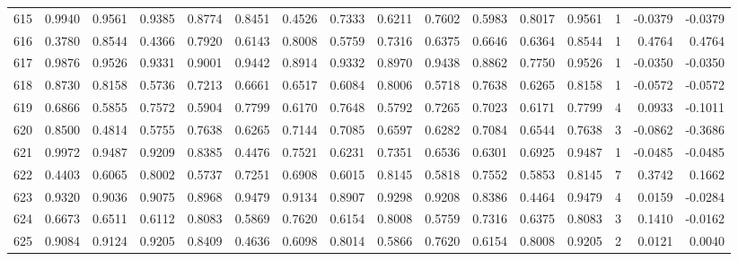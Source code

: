 \begin{tabular}{lrrrrrrrrrrrrrrr}
615 &      0.9940 &  0.9561 &  0.9385 &  0.8774 &  0.8451 &  0.4526 &  0.7333 &  0.6211 &  0.7602 &  0.5983 &   0.8017 &     0.9561 &      1 &                   -0.0379 &                    -0.0379 \\
616 &      0.3780 &  0.8544 &  0.4366 &  0.7920 &  0.6143 &  0.8008 &  0.5759 &  0.7316 &  0.6375 &  0.6646 &   0.6364 &     0.8544 &      1 &                    0.4764 &                     0.4764 \\
617 &      0.9876 &  0.9526 &  0.9331 &  0.9001 &  0.9442 &  0.8914 &  0.9332 &  0.8970 &  0.9438 &  0.8862 &   0.7750 &     0.9526 &      1 &                   -0.0350 &                    -0.0350 \\
618 &      0.8730 &  0.8158 &  0.5736 &  0.7213 &  0.6661 &  0.6517 &  0.6084 &  0.8006 &  0.5718 &  0.7638 &   0.6265 &     0.8158 &      1 &                   -0.0572 &                    -0.0572 \\
619 &      0.6866 &  0.5855 &  0.7572 &  0.5904 &  0.7799 &  0.6170 &  0.7648 &  0.5792 &  0.7265 &  0.7023 &   0.6171 &     0.7799 &      4 &                    0.0933 &                    -0.1011 \\
620 &      0.8500 &  0.4814 &  0.5755 &  0.7638 &  0.6265 &  0.7144 &  0.7085 &  0.6597 &  0.6282 &  0.7084 &   0.6544 &     0.7638 &      3 &                   -0.0862 &                    -0.3686 \\
621 &      0.9972 &  0.9487 &  0.9209 &  0.8385 &  0.4476 &  0.7521 &  0.6231 &  0.7351 &  0.6536 &  0.6301 &   0.6925 &     0.9487 &      1 &                   -0.0485 &                    -0.0485 \\
622 &      0.4403 &  0.6065 &  0.8002 &  0.5737 &  0.7251 &  0.6908 &  0.6015 &  0.8145 &  0.5818 &  0.7552 &   0.5853 &     0.8145 &      7 &                    0.3742 &                     0.1662 \\
623 &      0.9320 &  0.9036 &  0.9075 &  0.8968 &  0.9479 &  0.9134 &  0.8907 &  0.9298 &  0.9208 &  0.8386 &   0.4464 &     0.9479 &      4 &                    0.0159 &                    -0.0284 \\
624 &      0.6673 &  0.6511 &  0.6112 &  0.8083 &  0.5869 &  0.7620 &  0.6154 &  0.8008 &  0.5759 &  0.7316 &   0.6375 &     0.8083 &      3 &                    0.1410 &                    -0.0162 \\
625 &      0.9084 &  0.9124 &  0.9205 &  0.8409 &  0.4636 &  0.6098 &  0.8014 &  0.5866 &  0.7620 &  0.6154 &   0.8008 &     0.9205 &      2 &                    0.0121 &                     0.0040 \\

\end{tabular}
